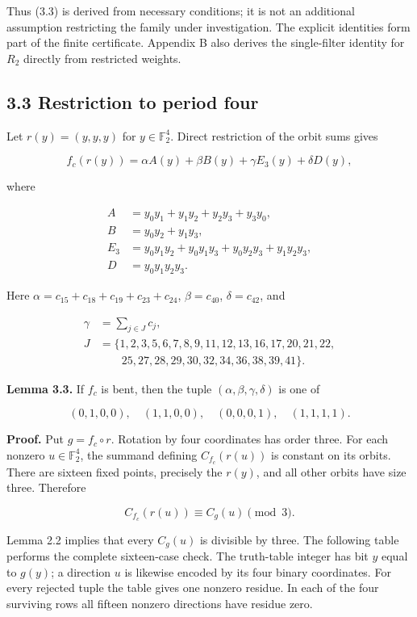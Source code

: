 \documentclass[11pt,a4paper]{article}
\begin{document}
Thus (3.3) is derived from necessary conditions; it is not an additional assumption restricting the family under investigation. The explicit identities form part of the finite certificate. Appendix B also derives the single-filter identity for $R_2$ directly from restricted weights.

\subsection*{3.3 Restriction to period four}

Let $r(y)=(y,y,y)$ for $y\in\mathbb F_2^4$. Direct restriction of the orbit sums gives

\[
f_c(r(y))=\alpha A(y)+\beta B(y)+\gamma E_3(y)+\delta D(y), \tag{3.4}
\]

where

\[
\begin{aligned}
A&=y_0y_1+y_1y_2+y_2y_3+y_3y_0,\\
B&=y_0y_2+y_1y_3,\\
E_3&=y_0y_1y_2+y_0y_1y_3+y_0y_2y_3+y_1y_2y_3,\\
D&=y_0y_1y_2y_3.
\end{aligned}
\]

Here $\alpha=c_{15}+c_{18}+c_{19}+c_{23}+c_{24}$, $\beta=c_{40}$, $\delta=c_{42}$, and

\[
\begin{aligned}\gamma&=\sum_{j\in J}c_j,\\J&=\{1,2,3,5,6,7,8,9,11,12,13,16,17,20,21,22,\\&\qquad25,27,28,29,30,32,34,36,38,39,41\}.\end{aligned} \tag{3.5}
\]

\textbf{Lemma 3.3.} If $f_c$ is bent, then the tuple $(\alpha,\beta,\gamma,\delta)$ is one of

\[
(0,1,0,0),\quad(1,1,0,0),\quad(0,0,0,1),\quad(1,1,1,1). \tag{3.6}
\]

\textbf{Proof.} Put $g=f_c\circ r$. Rotation by four coordinates has order three. For each nonzero $u\in\mathbb F_2^4$, the summand defining $C_{f_c}(r(u))$ is constant on its orbits. There are sixteen fixed points, precisely the $r(y)$, and all other orbits have size three. Therefore

\[
C_{f_c}(r(u))\equiv C_g(u)\pmod3. \tag{3.7}
\]

Lemma 2.2 implies that every $C_g(u)$ is divisible by three. The following table performs the complete sixteen-case check. The truth-table integer has bit $y$ equal to $g(y)$; a direction $u$ is likewise encoded by its four binary coordinates. For every rejected tuple the table gives one nonzero residue. In each of the four surviving rows all fifteen nonzero directions have residue zero.
\end{document}
